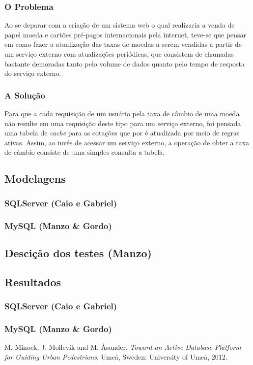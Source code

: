 \documentclass[conference]{IEEEtran}
\begin{document}
    \subsubsection{O Problema}
    Ao se deparar com a criação de um sistema web o qual realizaria a venda de papel moeda e cartões pré-pagos internacionais pela internet, teve-se que pensar em como fazer a atualização das taxas de moedas a serem vendidas a partir de um serviço externo com atualizações periódicas, que consistem de chamadas bastante demoradas tanto pelo volume de dados quanto pelo tempo de resposta do serviço externo.

    \subsubsection{A Solução}
    Para que a cada requisição de um usuário pela taxa de câmbio de uma moeda não resulte em uma requisição deste tipo para um serviço externo, foi pensada uma tabela de \textit{cache} para as cotações que por é atualizada por meio de regras ativas. Assim, ao invés de acessar um serviço externo, a operação de obter a taxa de câmbio consiste de uma simples consulta a tabela.

  \subsection{Modelagens}
    \subsubsection{SQLServer (Caio e Gabriel)}
    \subsubsection{MySQL (Manzo \& Gordo)}

  \subsection{Descição dos testes (Manzo)}

  \subsection{Resultados}
    \subsubsection{SQLServer (Caio e Gabriel)}
    \subsubsection{MySQL (Manzo \& Gordo)}


\begin{thebibliography}{1}

M. Minock, J. Mollevik and M. \r{A}sander, \textit{Toward an Active Database Platform for Guiding Urban Pedestrians}. Ume\r{a}, Sweden: University of Ume\r{a}, 2012.

\end{thebibliography}
\end{document}
